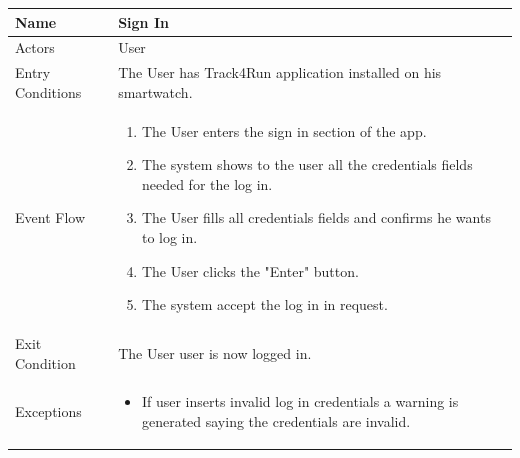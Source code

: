 \begin{enumerate}
\FloatBarrier
\begin{table}[h]
\begin{tabular}{|l|p{}|}
\hline
Name             & Sign In \\ \hline
Actors           & User  \\ \hline
Entry Conditions & The User has Track4Run application installed on his smartwatch.    \\ \hline
Event Flow       & \begin{enumerate}
			\item The User enters the sign in section of the app.
            \item The system shows to the user all the credentials fields needed for the log in.
            \item The User fills all credentials fields and confirms he wants to log in.
            \item The User clicks the "Enter" button.
            \item The system accept the log in in request.
        \end{enumerate}\\ \hline
Exit Condition   & The User user is now logged in.\\ \hline
Exceptions       & \begin{itemize}
\item If user inserts invalid log in credentials a warning is generated saying the credentials are invalid.
\end{itemize}\\ \hline
\end{tabular}
\end{table}
\FloatBarrier


\end{enumerate}
